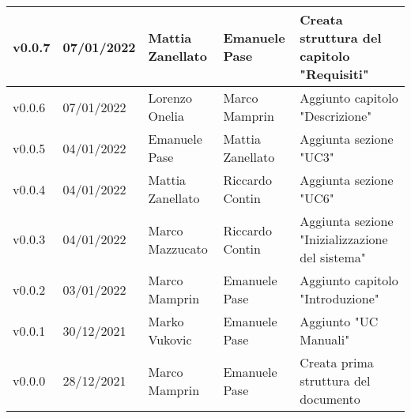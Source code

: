 {\begin{longtable}{|C{1.8cm}|C{2.1cm}|C{2cm}|C{2.4cm}|L{4.4cm}|}
  v0.0.7            & 07/01/2022    & Mattia Zanellato  & Emanuele Pase       & Creata struttura del capitolo "Requisiti"       \\ \hline
  v0.0.6            & 07/01/2022    & Lorenzo Onelia    & Marco Mamprin       & Aggiunto capitolo "Descrizione"                 \\ \hline
  v0.0.5            & 04/01/2022    & Emanuele Pase     & Mattia Zanellato    & Aggiunta sezione "UC3"                          \\ \hline
  v0.0.4            & 04/01/2022    & Mattia Zanellato  & Riccardo Contin     & Aggiunta sezione "UC6"                          \\ \hline
  v0.0.3            & 04/01/2022    & Marco Mazzucato   & Riccardo Contin     & Aggiunta sezione "Inizializzazione del sistema" \\ \hline
  v0.0.2            & 03/01/2022    & Marco Mamprin     & Emanuele Pase       & Aggiunto capitolo "Introduzione"                \\ \hline
  v0.0.1            & 30/12/2021    & Marko Vukovic     & Emanuele Pase       & Aggiunto "UC Manuali"                            \\ \hline
  v0.0.0            & 28/12/2021    & Marco Mamprin     & Emanuele Pase       & Creata prima struttura del documento            \\ \hline
\end{longtable}}

\renewcommand\arraystretch{1}
